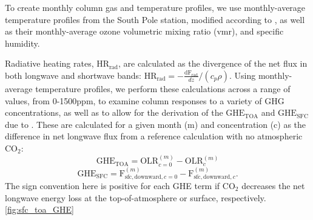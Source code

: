\documentclass[draft]{agujournal2019}
\begin{document}
To create monthly column gas and temperature profiles, we use monthly-average temperature profiles from the South Pole station, modified according to , as well as their monthly-average ozone volumetric mixing ratio (vmr), and specific humidity. 

Radiative heating rates, $\text{HR}_{\text{rad}}$, are calculated as the divergence of the net flux in both longwave and shortwave bands: $\text{HR}_{\text{rad}} = -\frac{\text{dF}_{\text{rad}}}{dz} /(c_p \rho) $. Using monthly-average temperature profiles, we perform these calculations across a range of  values, from 0-1500ppm, to examine column responses to a variety of GHG concentrations, as well as to allow for the derivation of the $\text{GHE}_\text{{TOA}}$ and $\text{GHE}_{\text{SFC}}$ due to .  These are calculated for a given month (m) and  concentration (c) as the difference in net longwave flux from a reference calculation with no atmospheric CO$_2$: 
\begin{equation}
    {\text{GHE}_\text{{TOA}}} = \text{OLR}_{c=0}^{(m)} - \text{OLR}_{c}^{(m)}
\end{equation}
\begin{equation}
    {\text{GHE}_\text{{SFC}}} = \text{F}_{\text{sfc}, \text{downward}, c=0}^{(m)} - \text{F}_{\text{sfc}, \text{downward}, c}^{(m)}.
\end{equation}
The sign convention here is positive for each GHE term if CO$_2$ decreases the net longwave energy loss at the top-of-atmosphere or surface, respectively. \ref{fig:sfc_toa_GHE} \cite{loeb_clouds_2018,kato_surface_2018}   
\end{document}
